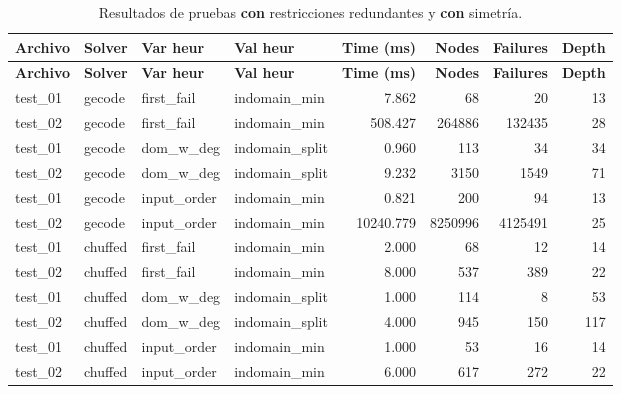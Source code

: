\begin{longtable}{l l l l r r r r}
    \caption{Resultados de pruebas \textbf{con} restricciones redundantes y \textbf{con} simetría.}\label{tab:pruebas-jobshop_mantenimiento-on-on}        \\
    \toprule
    \textbf{Archivo} & \textbf{Solver} & \textbf{Var heur} & \textbf{Val heur} & \textbf{Time (ms)} & \textbf{Nodes} & \textbf{Failures} & \textbf{Depth} \\
    \midrule
    \endfirsthead
    \toprule
    \textbf{Archivo} & \textbf{Solver} & \textbf{Var heur} & \textbf{Val heur} & \textbf{Time (ms)} & \textbf{Nodes} & \textbf{Failures} & \textbf{Depth} \\
    \midrule
    \endhead
    \bottomrule
    \endlastfoot

    test\_01         & gecode          & first\_fail       & indomain\_min     & 7.862              & 68             & 20                & 13             \\
    test\_02         & gecode          & first\_fail       & indomain\_min     & 508.427            & 264886         & 132435            & 28             \\
    \midrule
    test\_01         & gecode          & dom\_w\_deg       & indomain\_split   & 0.960              & 113            & 34                & 34             \\
    test\_02         & gecode          & dom\_w\_deg       & indomain\_split   & 9.232              & 3150           & 1549              & 71             \\
    \midrule
    test\_01         & gecode          & input\_order      & indomain\_min     & 0.821              & 200            & 94                & 13             \\
    test\_02         & gecode          & input\_order      & indomain\_min     & 10240.779          & 8250996        & 4125491           & 25             \\
    \midrule
    test\_01         & chuffed         & first\_fail       & indomain\_min     & 2.000              & 68             & 12                & 14             \\
    test\_02         & chuffed         & first\_fail       & indomain\_min     & 8.000              & 537            & 389               & 22             \\
    \midrule
    test\_01         & chuffed         & dom\_w\_deg       & indomain\_split   & 1.000              & 114            & 8                 & 53             \\
    test\_02         & chuffed         & dom\_w\_deg       & indomain\_split   & 4.000              & 945            & 150               & 117            \\
    \midrule
    test\_01         & chuffed         & input\_order      & indomain\_min     & 1.000              & 53             & 16                & 14             \\
    test\_02         & chuffed         & input\_order      & indomain\_min     & 6.000              & 617            & 272               & 22             \\
\end{longtable}

